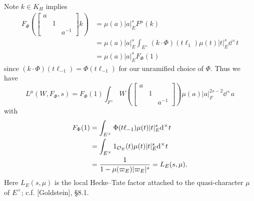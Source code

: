 Note $k \in K_H$ implies
\begin{align*}
    F_\Phi \left(\begin{bmatrix}
        a & & \\ & 1 & \\ & & a^{-1}
    \end{bmatrix}k\right) &= \mu(a) |a|_E^s F^\mu(k) \\
    &= \mu(a)|a|_E^s \int_{E^\times} (k \cdot \Phi) (t \ell_{1}) \mu(t) |t|_E^s \dd^\times t \\
    &= \mu(a) |a|_E^s F_\Phi(1)
\end{align*}
since $(k \cdot \Phi)(t \ell_{-1}) = \Phi(t \ell_{-1})$ for our unramified choice of $\Phi$.
Thus we have
\[
    L^\mu(W, F_\Phi, s) = F_\Phi(1) \int_{F^\times} W\left(\begin{bmatrix}
        a & & \\ & 1 & \\ & & a^{-1}
    \end{bmatrix}\right) \mu(a) |a|_F^{2s - 2} \dd^\times a
\]
with
\begin{align*}
    F_\Phi(1) &= \int_{E^\times}\Phi(t \ell_{-1}) \mu(t) |t|_E^s \mathrm{d}^\times t \\
    &= \int_{E^\times} 1_{\mathcal{O}_E} (t) \mu(t) |t|_E^s \mathrm{d}^\times t \\
    &= \frac{1}{1 - \mu(\varpi_E) |\varpi_E|^{s}} = L_E(s, \mu).
\end{align*}
Here $L_E(s, \mu)$ is the local Hecke--Tate factor attached to the quasi-character $\mu$ of $E^\times$; c.f. [Goldstein], \S 8.1.


\subsection{}
\label{sec:4.7}


